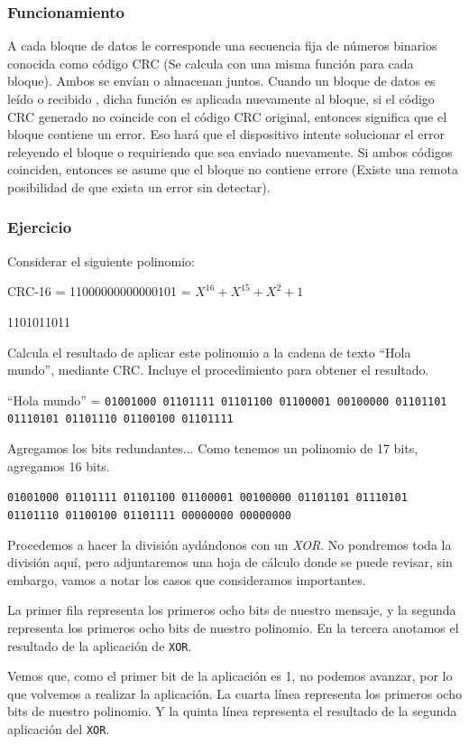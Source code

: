 \documentclass[spanish,12pt,letterpaper]{article}
\begin{document}
\subsubsection{Funcionamiento}
A cada bloque de datos le corresponde una secuencia fija de números binarios
conocida como código CRC (Se calcula con una misma función para cada bloque).
Ambos se envían o almacenan juntos. Cuando un bloque de datos es leído o recibido
, dicha función es aplicada nuevamente al bloque, si el código CRC generado no
coincide con el código CRC original, entonces significa que el bloque contiene
un error. Eso hará que el dispositivo intente solucionar el error releyendo el
bloque o requiriendo que sea enviado nuevamente. Si ambos códigos coinciden,
entonces se asume que el bloque no contiene errore (Existe una remota posibilidad
de que exista un error sin detectar).

\subsubsection{Ejercicio}

Considerar el siguiente polinomio:

CRC-16 = 11000000000000101 = $X^{16} + X^{15} + X^{2}+ 1$

1101011011

Calcula el resultado de aplicar este polinomio a la cadena de texto ``Hola
mundo'', mediante CRC. Incluye el procedimiento para obtener el resultado.

``Hola mundo'' = \texttt{01001000 01101111 01101100 01100001 00100000 01101101
  01110101 01101110 01100100 01101111}

Agregamos los bits redundantes... Como tenemos un polinomio de 17 bits, agregamos
16 bits.

\texttt{01001000 01101111 01101100 01100001 00100000 01101101 01110101 01101110
  01100100 01101111 00000000 00000000}

Procedemos a hacer la división aydándonos con un \textit{XOR}. No pondremos toda
la división aquí, pero adjuntaremos una hoja de cálculo donde se puede revisar,
sin embargo, vamos a notar los casos que consideramos importantes.

La primer fila representa los primeros ocho bits de nuestro mensaje, y la segunda
representa los primeros ocho bits de nuestro polinomio. En la tercera anotamos el
resultado de la aplicación de \texttt{XOR}.

Vemos que, como el primer bit de la aplicación es 1, no podemos avanzar, por lo
que volvemos a realizar la aplicación. La cuarta línea representa los primeros
ocho bits de nuestro polinomio. Y la quinta línea representa el resultado de la
segunda aplicación del \texttt{XOR}.
\end{document}
